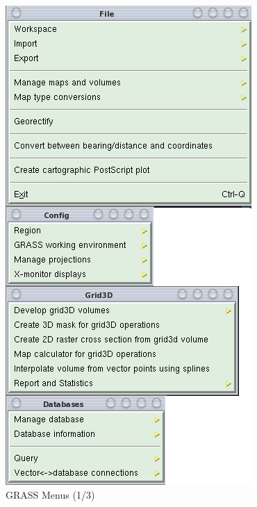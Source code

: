 \begin{figure}[htbp]
   \centering
   \includegraphics[scale=0.4]{grass025.png}
   \caption{GRASS Menus (1/3)}
   \label{fig:grass025}
\end{figure}

